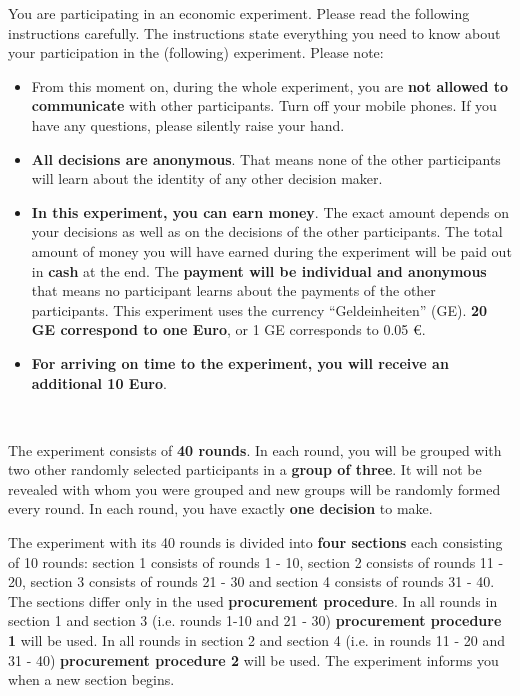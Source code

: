\documentclass[11pt]{article}
\begin{document}
	


You are participating in an economic experiment. Please read the following instructions carefully. The instructions state everything you need to know about your participation in the (following) experiment. \bigbreak
Please note:
\begin{itemize}
	\item From this moment on, during the whole experiment, you are \textbf{not allowed to communicate} with other participants. Turn off your mobile phones. If you have any questions, please silently raise your hand.
	\item \textbf{All decisions are anonymous}. That means none of the other participants will learn about the identity of any other decision maker.
	\item \textbf{In this experiment, you can earn money}. The exact amount depends on your decisions as well as on the decisions of the other participants. The total amount of money you will have earned during the experiment will be paid out in \textbf{cash} at the end. The \textbf{payment will be individual and anonymous} that means no participant learns about the payments of the other participants. This experiment uses the currency \enquote{Geldeinheiten} (GE). \textbf{20 GE correspond to one Euro}, or 1 GE corresponds to 0.05 €.
	\item \textbf{For arriving on time to the experiment, you will receive an additional 10 Euro}.
\end{itemize}

~\par
		

The experiment consists of \textbf{40 rounds}. In each round, you will be grouped with two other randomly selected participants in a \textbf{group of three}. It will not be revealed with whom you were grouped and new groups will be randomly formed every round. In each round, you have exactly \textbf{one decision} to make.



The experiment with its 40 rounds is divided into \textbf{four sections} each consisting of 10 rounds: section 1 consists of rounds 1 - 10, section 2 consists of rounds 11 - 20, section 3 consists of rounds 21 - 30 and section 4 consists of rounds 31 - 40. ~\bigskip
The sections differ only in the used \textbf{procurement procedure}. In all rounds in section 1 and section 3 (i.e. rounds 1-10 and 21 - 30) \textbf{procurement procedure 1} will be used. In all rounds in section 2 and section 4 (i.e. in rounds 11 - 20 and 31 - 40) \textbf{procurement procedure 2} will be used. The experiment informs you when a new section begins.
\end{document}
